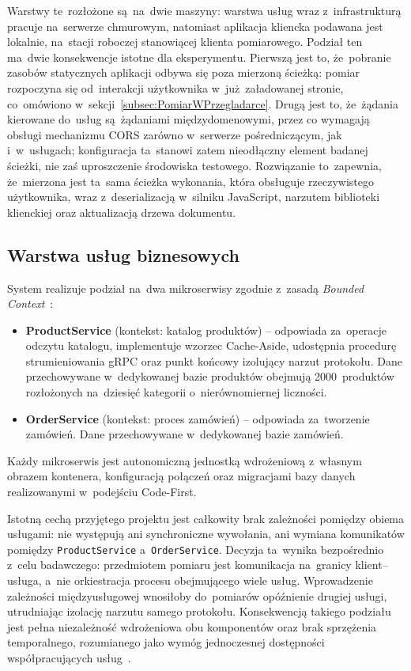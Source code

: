 Warstwy te~rozłożone są~na~dwie maszyny: warstwa usług wraz z~infrastrukturą pracuje na~serwerze chmurowym, natomiast aplikacja kliencka podawana jest lokalnie, na~stacji roboczej stanowiącej klienta pomiarowego. Podział ten ma~dwie konsekwencje istotne dla eksperymentu. Pierwszą jest to, że~pobranie zasobów statycznych aplikacji odbywa się poza mierzoną ścieżką: pomiar rozpoczyna się od~interakcji użytkownika w~już~załadowanej stronie, co~omówiono w~sekcji~\ref{subsec:PomiarWPrzegladarce}. Drugą jest to, że~żądania kierowane do~usług są~żądaniami międzydomenowymi, przez co wymagają obsługi mechanizmu CORS zarówno w~serwerze pośredniczącym, jak i~w~usługach; konfiguracja ta~stanowi zatem nieodłączny element badanej ścieżki, nie zaś uproszczenie środowiska testowego. Rozwiązanie to~zapewnia, że~mierzona jest ta~sama ścieżka wykonania, która obsługuje rzeczywistego użytkownika, wraz z~deserializacją w~silniku JavaScript, narzutem biblioteki klienckiej oraz aktualizacją drzewa dokumentu.

\subsection{Warstwa usług biznesowych}
\label{subsec:WarstwaBiznesowa}

System realizuje podział na~dwa mikroserwisy zgodnie z~zasadą \textit{Bounded Context}~\cite{bib:Evans2003}:

\begin{itemize}
    \item \textbf{ProductService} (kontekst: katalog produktów) -- odpowiada za~operacje odczytu katalogu, implementuje wzorzec Cache-Aside, udostępnia procedurę strumieniowania gRPC oraz punkt końcowy izolujący narzut protokołu. Dane przechowywane w~dedykowanej bazie produktów obejmują 2000~produktów rozłożonych na~dziesięć kategorii o~nierównomiernej liczności.
    \item \textbf{OrderService} (kontekst: proces zamówień) -- odpowiada za~tworzenie zamówień. Dane przechowywane w~dedykowanej bazie zamówień.
\end{itemize}

Każdy mikroserwis jest autonomiczną jednostką wdrożeniową z~własnym obrazem kontenera, konfiguracją połączeń oraz migracjami bazy danych realizowanymi w~podejściu Code-First.

Istotną cechą przyjętego projektu jest całkowity brak zależności pomiędzy obiema usługami: nie występują ani synchroniczne wywołania, ani wymiana komunikatów pomiędzy \texttt{ProductService} a~\texttt{OrderService}. Decyzja ta~wynika bezpośrednio z~celu badawczego: przedmiotem pomiaru jest komunikacja na~granicy klient--usługa, a~nie orkiestracja procesu obejmującego wiele usług. Wprowadzenie zależności międzyusługowej wnosiłoby do~pomiarów opóźnienie drugiej usługi, utrudniając izolację narzutu samego protokołu. Konsekwencją takiego podziału jest pełna niezależność wdrożeniowa obu komponentów oraz brak sprzężenia temporalnego, rozumianego jako wymóg jednoczesnej dostępności współpracujących usług~\cite{bib:Newman2021}.

